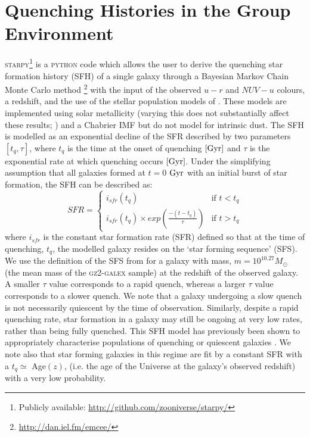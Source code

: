 \documentclass[useAMS,usenatbib]{mn2e}
\begin{document}
\section{Quenching Histories in the Group Environment}\label{sec:starpy}

\textsc{starpy}\footnote{Publicly available: \url{http://github.com/zooniverse/starpy/}} is a \textsc{python} code which allows the user to derive the quenching star formation history (SFH) of a single galaxy through a Bayesian Markov Chain Monte Carlo method \citep{emcee13}\footnote{\url{http://dan.iel.fm/emcee/}} with the input of the observed $u-r$ and $NUV-u$ colours, a redshift, and the use of the stellar population models of \cite{BC03}.  These models are implemented using solar metallicity (varying this does not substantially affect these results; \citealt{smethurst15}) and a Chabrier IMF \citep{chabrier03} but do not model for intrinsic dust. The SFH is modelled as an exponential decline of the SFR described by two parameters $[t_{q}, \tau]$, where $t_{q}$ is the time at the onset of quenching $\rm{[Gyr]}$ and $\tau$ is the exponential rate at which quenching occurs $\rm{[Gyr]}$. Under the simplifying assumption that all galaxies formed at $t=0$ $\rm{ Gyr}$ with an initial burst of star formation, the SFH can be described as: 
\begin{equation}\label{sfh}
SFR =
\begin{cases}
i_{sfr}(t_{q}) & \text{if } t < t_{q} \\
i_{sfr}(t_{q}) \times exp{\left( \frac{-(t-t_{q})}{\tau}\right)} & \text{if } t > t_{q} 
\end{cases}
\end{equation}
where $i_{sfr}$ is the constant star formation rate (SFR) defined so that at the time of quenching, $t_{q}$, the modelled galaxy resides on the `star forming sequence' (SFS). We use the definition of the SFS from \cite{peng10} for a galaxy with mass, $m = 10^{10.27} M_{\odot}$ (the mean mass of the \textsc{gz2-galex} sample) at the redshift of the observed galaxy.  A smaller $\tau$ value corresponds to a rapid quench, whereas a larger $\tau$ value corresponds to a slower quench. We note that a galaxy undergoing a slow quench is not necessarily quiescent by the time of observation. Similarly, despite a rapid quenching rate, star formation in a galaxy may still be ongoing at very low rates, rather than being fully quenched. This SFH model has previously been shown to appropriately characterise populations of quenching or quiescent galaxies \citep{Weiner06, Martin07, Noeske07,schawinski14}. We note also that star forming galaxies in this regime are fit by a constant SFR with a $t_{q} \simeq$ Age$(z)$, (i.e. the age of the Universe at the galaxy's observed redshift) with a very low probability.
\end{document}
